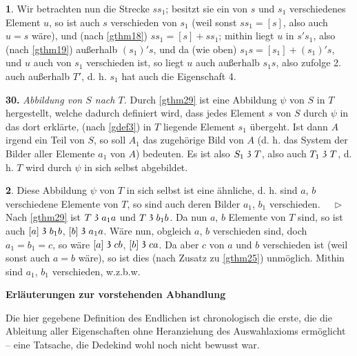 \documentclass[leqno,hidelinks,10pt]{article}
\theoremstyle{definition}
\newtheorem{satz}{\protect\satzname}
\newcommand{\satzname}{}
\renewcommand{\satzname}{\hspace{-4pt}.\ Satz}%
\renewcommand{\satzname}{\hspace{-4pt}.\ Theorem}%
\newcommand\Beweis{\medskip \newline $ \phantom{'.'} \rhd \ $}%
\newcommand\TeilVon{\mathrel{\raisebox{0.45ex}{$\mathfrak{3}$}}}
\newcommand{\sref}[1]{\underline{\ref{#1}}}%
\begin{document}
\begin{paracol}{2}
\begin{leftcolumn}
\begin{satz}
Wir betrachten nun die Strecke $ss_1$; besitzt sie ein von $s$ und $s_1$
verschiedenes Element $u$, so ist auch $s$ verschieden von $s_1$ (weil sonst
$ss_1 = [s]$, also auch $u = s$ wäre), und (nach \sref{gthm18}) $ss_1 = [s] + ss_1$;
mithin liegt $u$ in $s's_1$, also (nach \sref{gthm19}) außerhalb $(s_1)'s$, und
da (wie oben) $s_1s = [s_1] + (s_1)'s$, und $u$ auch von $s_1$ verschieden ist, so
liegt $u$ auch außerhalb  $s_1s$, also zufolge 2. auch außerhalb $T'$, d. h. $s_1$
hat auch die Eigenschaft 4.
\end{satz}

\noindent \textbf{30.}\label{gthm30} \emph{Abbildung von $S$ nach $T$.}
Durch \sref{gthm29} ist eine Abbildung $\psi$ von $S$ in $T$ hergestellt, welche
dadurch definiert wird, dass jedes Element $s$ von $S$ durch $\psi$ in das dort
erklärte, (nach \sref{gdef3}) in $T$ liegende Element $s_1$ übergeht. Ist dann
$A$ irgend ein Teil von $S$, so soll $A_1$ das zugehörige Bild von $A$ (d. h.
das System der Bilder aller Elemente $a_1$ von $A$) bedeuten. Es ist also
$S_1 \TeilVon T$, also auch $T_1 \TeilVon T$, d. h. $T$ wird durch $\psi$ in sich
selbst abgebildet.

\begin{satz}\label{gthm31}
Diese Abbildung $\psi$ von $T$ in sich selbst ist eine ähnliche, d. h. sind $a$, $b$
verschiedene Elemente von $T$, so sind auch deren Bilder $a_1$, $b_1$ verschieden.
\Beweis
Nach \sref{gthm29} ist $T \TeilVon a_1a$ und $T \TeilVon b_1b$. Da nun $a$, $b$
Elemente von $T$ sind, so ist auch $[a] \TeilVon b_1b$, $[b] \TeilVon a_1a$. Wäre
nun, obgleich $a$, $b$ verschieden sind, doch $a_1 = b_1 = c$, so wäre
$[a] \TeilVon cb$, $[b] \TeilVon ca$. Da aber $c$ von $a$ und $b$ verschieden
ist (weil sonst auch $a = b$ wäre), so ist dies (nach Zusatz zu \sref{gthm25})
unmöglich. Mithin sind $a_1$, $b_1$ verschieden, w.z.b.w.
\end{satz}

\newpage

\hspace{64pt}

\begin{center}\Large\textbf{Erläuterungen zur vorstehenden Abhandlung}
\end{center}\par

\bigskip
\justifying
\fontsize{9}{9}\selectfont
Die hier gegebene Definition des Endlichen ist chronologisch die erste, die die
Ableitung aller Eigenschaften ohne Heranziehung des Auswahlaxioms ermöglicht --
eine Tatsache, die Dedekind wohl noch nicht bewusst war.


\end{leftcolumn}
\end{paracol}
\end{document}
